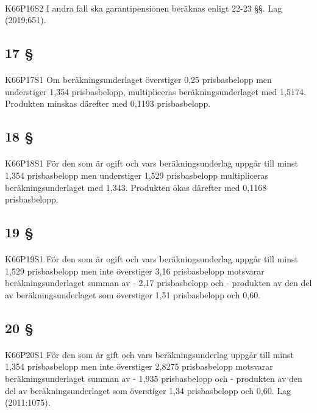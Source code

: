 \documentclass[a4paper,notitlepage,openany,10pt]{book}
\begin{document}
\paragraph*{}
{\tiny K66P16S2}
I andra fall ska garantipensionen beräknas enligt 22-23 §§.
Lag (2019:651).
\subsection*{17 §}
\paragraph*{}
{\tiny K66P17S1}
Om beräkningsunderlaget överstiger 0,25 prisbasbelopp men understiger 1,354 prisbasbelopp, multipliceras beräkningsunderlaget med 1,5174. Produkten minskas därefter med 0,1193 prisbasbelopp.
\subsection*{18 §}
\paragraph*{}
{\tiny K66P18S1}
För den som är ogift och vars beräkningsunderlag uppgår till minst 1,354 prisbasbelopp men understiger 1,529 prisbasbelopp multipliceras beräkningsunderlaget med 1,343.
Produkten ökas därefter med 0,1168 prisbasbelopp.
\subsection*{19 §}
\paragraph*{}
{\tiny K66P19S1}
För den som är ogift och vars beräkningsunderlag uppgår till minst 1,529 prisbasbelopp men inte överstiger 3,16 prisbasbelopp motsvarar beräkningsunderlaget summan av
\newline - 2,17 prisbasbelopp och
\newline - produkten av den del av beräkningsunderlaget som överstiger 1,51 prisbasbelopp och 0,60.
\subsection*{20 §}
\paragraph*{}
{\tiny K66P20S1}
För den som är gift och vars beräkningsunderlag uppgår till minst 1,354 prisbasbelopp men inte överstiger 2,8275 prisbasbelopp motsvarar beräkningsunderlaget summan av - 1,935 prisbasbelopp och
\newline - produkten av den del av beräkningsunderlaget som överstiger 1,34 prisbasbelopp och 0,60.
Lag (2011:1075).
\end{document}
